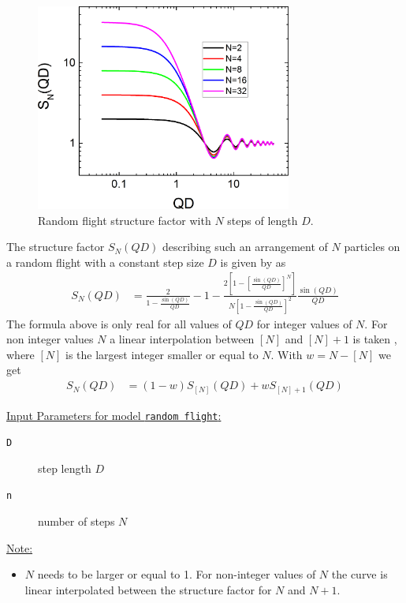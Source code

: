 \begin{figure}[htb]
\begin{center}
\includegraphics[width=0.75\textwidth]{../images/structure_factor/randomflight.png}
\end{center}
\caption{Random flight structure factor with $N$ steps of length $D$.}
\label{fig:randomflight}
\end{figure}

The structure factor $S_N(QD)$ describing such an arrangement of $N$ particles on a random flight
with a constant step size $D$ is given by \cite{Burchard1970} as
\begin{align}
S_N(QD)&=
    \frac{2}{1-\frac{\sin(QD)}{QD}}-1-\frac{2\left[1-\left[\frac{\sin(QD)}{QD}\right]^N\right]}{N\left[1-\frac{\sin(QD)}{QD}\right]^2}\frac{\sin(QD)}{QD}
\end{align}
The formula above is only real for all values of $QD$ for integer values of $N$. For non integer values $N$ a linear interpolation between $[N]$ and $[N]+1$ is taken \cite{Giehm2010}, where $[N]$ is the largest integer smaller or equal to $N$. With $w=N-[N]$ we get
\begin{align}
S_N(QD)&= (1-w)S_{[N]}(QD) + wS_{[N]+1}(QD)
\end{align}

\noindent \underline{Input Parameters for model \texttt{random flight}:}\\
\begin{description}
\item[\texttt{D}] step length $D$
\item[\texttt{n}] number of steps $N$
\end{description}


\noindent\underline{Note:}
\begin{itemize}
\item $N$ needs to be larger or equal to 1. For non-integer values of $N$ the curve is linear interpolated between the structure factor for $N$ and $N+1$.
\end{itemize}



